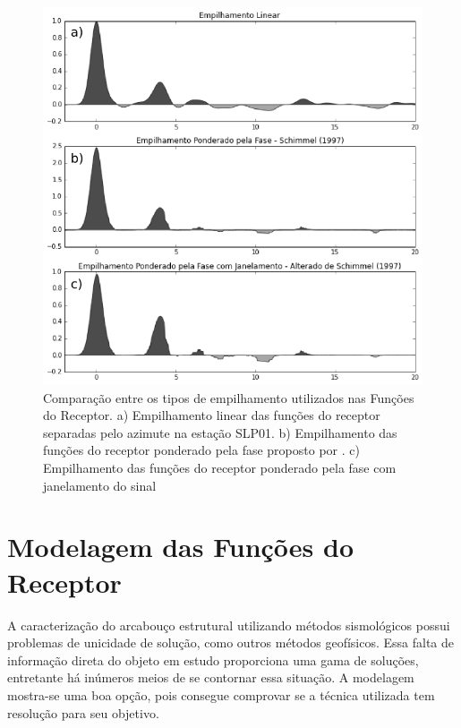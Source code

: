 \begin{figure}[!ht]
\centering
\includegraphics[scale=0.8]{Figs/empilhamento.png}
\caption[Comparação entre os tipos de empilhamento utilizados nas Funções do Receptor.]{Comparação entre os tipos de empilhamento utilizados nas Funções do Receptor. a) Empilhamento linear das funções do receptor separadas pelo azimute na estação SLP01. b)  Empilhamento das funções do receptor ponderado pela fase proposto por \cite{schimmel_noise_1997}. c) Empilhamento das funções do receptor ponderado pela fase com janelamento do sinal}
\label{empilhamento}
\end{figure}

\section{Modelagem das Funções do Receptor}

A caracterização do arcabouço estrutural utilizando métodos sismológicos possui problemas de unicidade de solução, como outros métodos geofísicos.  Essa falta de informação direta do objeto em estudo proporciona uma gama de soluções, entretante há inúmeros meios de se contornar essa situação. A modelagem mostra-se uma boa opção, pois consegue comprovar se a técnica utilizada tem resolução para seu objetivo.

